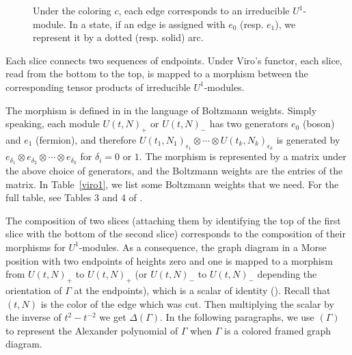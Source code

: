 \documentclass[12pt]{amsart}
\begin{document}
\begin{figure}
\centering
{}
\caption{Under the coloring $c$, each edge corresponds to an irreducible $U^1$-module. In a state, if an edge is assigned with $e_0$ (resp. $e_1$), we represent it by a dotted (resp. solid) arc.}
\label{fig3}
\end{figure}

Each slice connects two sequences of endpoints. Under Viro's functor, each slice, read from the bottom to the top, is mapped to a morphism between the corresponding tensor products of irreducible $U^1$-modules.

The morphism is defined in \cite{MR2255851} in the language of Boltzmann weights. Simply speaking, each module $U(t, N)_{+}$ or $U(t, N)_{-}$ has two generators $e_0$ (boson) and $e_1$ (fermion), and therefore 
$U(t_1, N_1)_{\epsilon_1}\otimes \cdots \otimes U(t_k, N_k)_{\epsilon_k}$ is generated by $e_{\delta_1}\otimes e_{\delta_2}\otimes \cdots \otimes e_{\delta_k}$ for $\delta_i=0$ or $1$. The morphism is represented by a matrix under the above choice of generators, and the Boltzmann weights are the entries of the matrix. In Table~\ref{viro1}, we list some Boltzmann weights that we need. For the full table, see Tables 3 and 4 of \cite{MR2255851}.

The composition of two slices (attaching them by identifying the top of the first slice with the bottom of the second slice) corresponds to the composition of their morphisms for $U^1$-modules. As a consequence, the graph diagram in a Morse position with two endpoints of heights zero and one is mapped to a morphism from $U(t, N)_+$ to $U(t, N)_+$ (or $U(t, N)_-$ to $U(t, N)_-$ depending the orientation of $\Gamma$ at the endpoints), which is a scalar of identity (\cite[6.2.A]{MR2255851}). Recall that $(t, N)$ is the color of the edge which was cut. Then multiplying the scalar by the inverse of $t^{2}-t^{-2}$ we get $\Delta(\Gamma)$. In the following paragraphs, we use $(\Gamma)$ to represent the Alexander polynomial of $\Gamma$ when $\Gamma$ is a colored framed graph diagram. 
\end{document}
